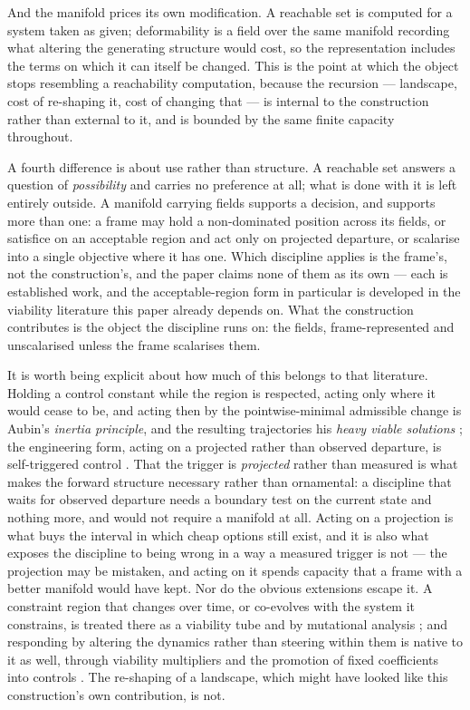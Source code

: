 \documentclass[11pt,a4paper]{article}
\theoremstyle{remark}
\begin{document}
And the manifold prices its own modification. A reachable set is computed for a system taken as
given; deformability is a field over the same manifold recording what altering the generating
structure would cost, so the representation includes the terms on which it can itself be changed.
This is the point at which the object stops resembling a reachability computation, because the
recursion --- landscape, cost of re-shaping it, cost of changing that --- is internal to the
construction rather than external to it, and is bounded by the same finite capacity throughout.

A fourth difference is about use rather than structure. A reachable set answers a question of
\emph{possibility} and carries no preference at all; what is done with it is left entirely outside.
A manifold carrying fields supports a decision, and supports more than one: a frame may hold a
non-dominated position across its fields, or satisfice on an acceptable region and act only on
projected departure, or scalarise into a single objective where it has one. Which discipline applies
is the frame's, not the construction's, and the paper claims none of them as its own --- each is
established work, and the acceptable-region form in particular is developed in the viability
literature this paper already depends on. What the construction contributes is the object the
discipline runs on: the fields, frame-represented and unscalarised unless the frame scalarises them.

It is worth being explicit about how much of this belongs to that literature. Holding a control constant while the region is respected,
acting only where it would cease to be, and acting then by the pointwise-minimal admissible change is
Aubin's \emph{inertia principle}, and the resulting trajectories his \emph{heavy viable solutions}
\citep{aubinfrankowska1989,aubin1991,aubinbayen2011}; the engineering form, acting on a projected
rather than observed departure, is self-triggered control \citep{tabuada2007,heemels2012}. That the trigger
is \emph{projected} rather than measured is what makes the forward structure necessary rather than
ornamental: a discipline that waits for observed departure needs a boundary test on the current
state and nothing more, and would not require a manifold at all. Acting on a projection is what buys
the interval in which cheap options still exist, and it is also what exposes the discipline to being
wrong in a way a measured trigger is not --- the projection may be mistaken, and acting on it spends
capacity that a frame with a better manifold would have kept. Nor do
the obvious extensions escape it. A constraint region that changes over time, or co-evolves with the
system it constrains, is treated there as a viability tube and by mutational analysis
\citep{aubin1999}; and responding by altering the dynamics rather than steering within them is
native to it as well, through viability multipliers and the promotion of fixed coefficients into
controls \citep{aubinbayen2011}. The re-shaping of a landscape, which might have looked like this
construction's own contribution, is not.
\end{document}
